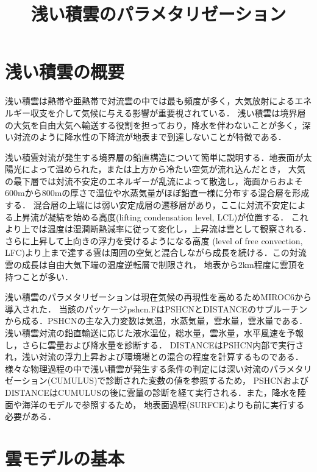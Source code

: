 \documentclass[platex, dvipdfmx]{jsarticle}
\title{浅い積雲のパラメタリゼーション}
\begin{document}
\maketitle

\section{浅い積雲の概要}
浅い積雲は熱帯や亜熱帯で対流雲の中では最も頻度が多く，大気放射によるエネルギー収支を介して気候に与える影響が重要視されている．
浅い積雲は境界層の大気を自由大気へ輸送する役割を担っており，降水を伴わないことが多く，深い対流のように降水性の下降流が地表まで到達しないことが特徴である．

浅い積雲対流が発生する境界層の鉛直構造について簡単に説明する．地表面が太陽光によって温められた，または上方から冷たい空気が流れ込んだとき，
大気の最下層では対流不安定のエネルギーが乱流によって散逸し，海面からおよそ600mから800mの厚さで温位や水蒸気量がほぼ鉛直一様に分布する混合層を形成する．
混合層の上端には弱い安定成層の遷移層があり，ここに対流不安定による上昇流が凝結を始める高度(lifting condensation level, LCL)が位置する．
これより上では温度は湿潤断熱減率に従って変化し，上昇流は雲として観察される．さらに上昇して上向きの浮力を受けるようになる高度
(level of free convection, LFC)より上まで達する雲は周囲の空気と混合しながら成長を続ける．この対流雲の成長は自由大気下端の温度逆転層で制限され，
地表から2km程度に雲頂を持つことが多い．


浅い積雲のパラメタリゼーションは現在気候の再現性を高めるためMIROC6から導入された．
当該のパッケージpshcn.FはPSHCNとDISTANCEのサブルーチンから成る．PSHCNの主な入力変数は気温，水蒸気量，雲水量，雲氷量である．
浅い積雲対流の鉛直輸送に応じた液水温位，総水量，雲氷量，水平風速を予報し，さらに雲量および降水量を診断する．
DISTANCEはPSHCN内部で実行され，浅い対流の浮力上昇および環境場との混合の程度を計算するものである．
様々な物理過程の中で浅い積雲が発生する条件の判定には深い対流のパラメタリゼーション(CUMULUS)で診断された変数の値を参照するため，
PSHCNおよびDISTANCEはCUMULUSの後に雲量の診断を経て実行される．また，降水を陸面や海洋のモデルで参照するため，
地表面過程(SURFCE)よりも前に実行する必要がある．

\section{雲モデルの基本}
\end{document}
